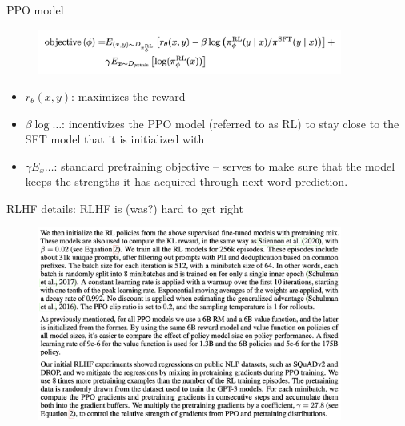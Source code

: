 \begin{vbframe}{PPO model}


\begin{figure}
\centering
\includegraphics[width = 10cm]{figure/objectiveppo.png}
\end{figure}


\begin{itemize}
\item $r_\theta(x,y)$: maximizes the reward
  \item $\beta \log \ldots$: incentivizes the PPO model
    (referred to as RL) to stay close to the SFT model that
    it is initialized with 
    \item $\gamma E_x \ldots$: standard
      pretraining objective -- serves to make sure
      that the model keeps the strengths it has acquired
      through next-word prediction.
\end{itemize}



\vfill

\end{vbframe}


\begin{vbframe}{RLHF details: RLHF is (was?) hard to get right}


\begin{figure}
\centering
\includegraphics[width = 10cm]{figure/rlhfdetails.png}
\end{figure}



\vfill

\end{vbframe}

